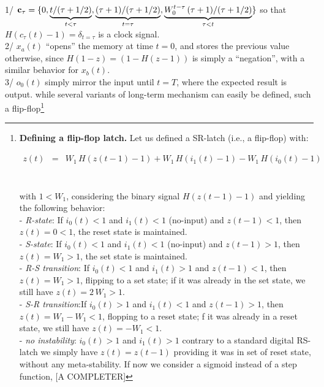 {\\ 1/ ${\bf c}_\tau = \{0, \underbrace{t / (\tau + 1/2)}_{t < \tau},  \underbrace{(\tau+1) / (\tau+1/2)}_{t = \tau}, \underbrace{W_0^{t-\tau} \, (\tau+1) / (\tau+1/2)}_{\tau < t}\}$ so that $H(c_\tau(t) - 1) = \delta_{t=\tau}$ is a clock signal. 
\\ 2/ $x_a(t)$ ``opens'' the memory at time $t=0$, and stores the previous value otherwise, since $H(1 - z) = (1 - H(z - 1))$ is simply a ``negation'', with a similar behavior for $x_b(t)$.
\\ 3/ $o_0(t)$ simply mirror the input until $t=T$, where the expected result is output.} while several variants of long-term mechanism can easily be defined, such a flip-flop\footnote{ {\bf Defining a flip-flop latch.} Let us defined a SR-latch (i.e., a flip-flop) with:
\\ \centerline{$\begin{array}{rcl}
z(t) &=& W_1 \, H(z(t-1) - 1) + W_1 \, H(i_1(t) - 1) - W_1 \, H(i_0(t) - 1)\\
\end{array}$} \\ 
with $1 < W_1$, considering the binary signal $H(z(t-1) - 1)$ and yielding the following behavior:
\\- {\em R-state}: If $i_0(t) < 1$ and $i_1(t) < 1$ (no-input) and $z(t-1) < 1$, then $z(t) = 0 < 1$, the reset state is maintained.
\\- {\em S-state}: If $i_0(t) < 1$ and $i_1(t) < 1$ (no-input) and $z(t-1) > 1$, then $z(t) = W_1 > 1$, the set state is maintained.
\\- {\em R-S transition}: If $i_0(t) < 1$ and $i_1(t) > 1$  and $z(t-1) < 1$, then $z(t) = W_1 > 1$, flipping to a set state; if it was already in the set state, we still have $z(t) = 2 \, W_1 > 1$.
\\- {\em S-R transition}:If $i_0(t) > 1$ and $i_1(t) < 1$  and $z(t-1) > 1$, then $z(t) = W_1 - W_1 < 1$, flopping to a reset state; f it was already in a reset state, we still have $z(t) = - W_1 < 1$.
\\- {\em no instability}: $i_0(t) > 1$ and $i_1(t) > 1$ contrary to a standard digital RS-latch we simply have $z(t) = z(t-1)$ providing it was in set of reset state, without any meta-stability.
If now we consider a sigmoid instead of a step function, [A COMPLETER]
}
